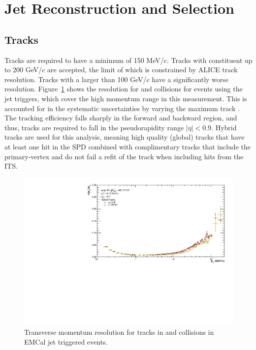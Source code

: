 \section{Jet Reconstruction and Selection}
\label{ch:JetReconstruction}

\subsection{Tracks}
\label{sec:TrackSelection}

Tracks are required to have a minimum \pT of 150 MeV/c. Tracks with constituent \pT up to 200 GeV/$c$ are accepted, the limit of which is constrained by ALICE track resolution. Tracks with a \pT larger than 100 GeV/$c$ have a significantly worse \pT resolution. Figure~\ref{fig:ptresolution} shows the \pT resolution for \pp and \pPb collisions for events using the jet triggers, which cover the high momentum range in this measurement. This is accounted for in the systematic uncertainties by varying the maximum track \pT. The tracking efficiency falls sharply in the forward and backward region, and thus, tracks are required to fall in the pseudorapidity range $|\eta| < 0.9$. Hybrid tracks are used for this analysis, meaning high quality (global) tracks that have at least one hit in the SPD combined with complimentary tracks that include the primary-vertex and do not fail a refit of the track when including hits from the ITS.

\begin{figure}[hbt!]
    \centering
    \includegraphics[width=\textwidth]{figures/TrackingQA/PtResolution/PtRes_ppVSpPb.pdf}
    \caption{Transverse momentum resolution for tracks in \pp and \pPb collisions in EMCal jet triggered events.}
    \label{fig:ptresolution}
\end{figure}

